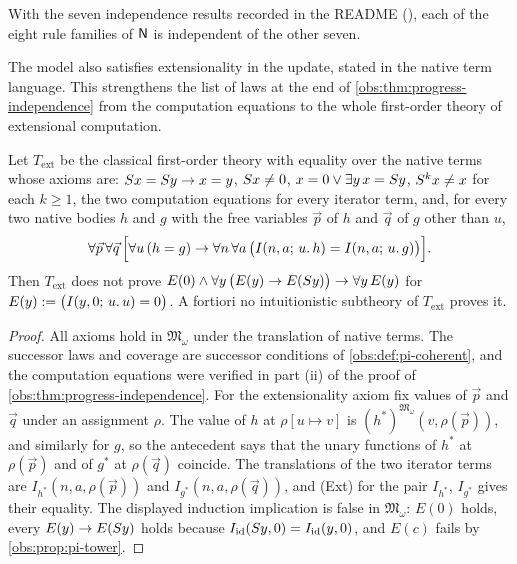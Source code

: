With the seven independence results recorded in the README
(), each of the eight rule families of $\mathsf{N}$ is independent
of the other seven.

The model also satisfies extensionality in the update, stated in the native
term language. This strengthens the list of laws at the end of
\cref{obs:thm:progress-independence} from the computation equations to the
whole first-order theory of extensional computation.

\begin{corollary}
\label{obs:cor:pi-extensional}
Let $T_{\mathrm{ext}}$ be the classical first-order theory with equality over
the native terms whose axioms are: $S x=S y\to x=y$, $S x\ne 0$,
$x=0\vee\exists y\,x=S y$, $S^{k}x\ne x$ for each $k\ge 1$, the two
computation equations for every iterator term, and, for every two native bodies
$h$ and $g$ with the free variables $\vec p$ of $h$ and $\vec q$ of $g$ other
than $u$,
\[
\forall\vec p\,\forall\vec q\,\Bigl[\forall u\,(h=g)\to
\forall n\,\forall a\,\bigl(I(n,a;\,u.\,h)=I(n,a;\,u.\,g)\bigr)\Bigr].
\]
Then $T_{\mathrm{ext}}$ does not prove
$E(0)\wedge\forall y\,\bigl(E(y)\to E(S y)\bigr)\to\forall y\,E(y)$ for
$E(y)\mathrel{:=}\bigl(I(y,0;\,u.\,u)=0\bigr)$. A fortiori no intuitionistic
subtheory of $T_{\mathrm{ext}}$ proves it.
\end{corollary}

\begin{proof}
All axioms hold in $\mathfrak{M}_\omega$ under the translation of native terms.
The successor laws and coverage are successor conditions of
\cref{obs:def:pi-coherent}, and the computation equations were verified in
part (ii) of the proof of \cref{obs:thm:progress-independence}. For the
extensionality axiom fix values of $\vec p$ and $\vec q$ under an assignment
$\rho$. The value of $h$ at $\rho[u\mapsto v]$ is
$(h^{*})^{\mathfrak{M}_\omega}(v,\rho(\vec p))$, and similarly for $g$, so the
antecedent says that the unary functions of $h^{*}$ at $\rho(\vec p)$ and of
$g^{*}$ at $\rho(\vec q)$ coincide. The translations of the two iterator terms
are $I_{h^{*}}(n,a,\rho(\vec p))$ and $I_{g^{*}}(n,a,\rho(\vec q))$, and (Ext)
for the pair $I_{h^{*}}$, $I_{g^{*}}$ gives their equality. The displayed
induction implication is false in $\mathfrak{M}_\omega$: $E(0)$ holds, every
$E(y)\to E(S y)$ holds because
$I_{\mathrm{id}}(S y,0)=I_{\mathrm{id}}(y,0)$, and $E(c)$ fails by
\cref{obs:prop:pi-tower}.
\end{proof}

